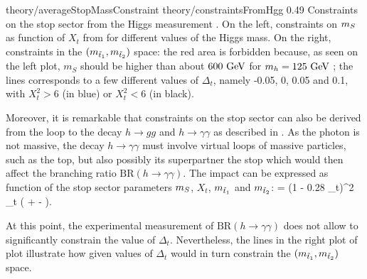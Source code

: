                      {theory/averageStopMassConstraint}
                     {theory/constraintsFromHgg}
                     {0.49}
                     {Constraints on the stop sector from the Higgs measurement \cite{TheLightStopWindow}.
                     On the left, constraints on $m_{S}$ as function of $X_t$ from
                     for different values of the Higgs mass. On the right, constraints
                     in the $(m_{\tilde{t}_1},m_{\tilde{t}_2})$ space: the
                     red area is forbidden because, as seen on the left plot, $m_S$
                     should be higher than about $600~\text{GeV}$ for $m_{h} = 125~\text{GeV}$ ;
                     the lines corresponds to a few different values of $\Delta_t$,
                     namely -0.05, 0, 0.05 and 0.1, with $X_t^2 > 6$ (in blue) or
                     $X_t^2 < 6$ (in black).
                     }

    Moreover, it is remarkable that constraints on the stop sector can also be derived
    from the loop to the decay $h \rightarrow gg$ and $h \rightarrow \gamma \gamma$
    as described in \cite{TheLightStopWindow}. As the photon is not massive,
    the decay $h \rightarrow \gamma \gamma$ must involve virtual loops of massive
    particles, such as the top, but also possibly its superpartner the stop which
    would then affect the branching ratio $\text{BR}(h \rightarrow \gamma\gamma)$.
    The impact can be expressed as function of the stop sector parameters $m_{S}$,
    $X_t$, $m_{\tilde{t}_1}$ and $m_{\tilde{t}_2}$:
    {
        =
        (1 - 0.28 \Delta_t)^2
        \hspace*{0.5cm}
        \hspace*{0.5cm}
        \Delta_t
        \approx
        \left(
            +
            -
        \right).
    }

    At this point, the experimental measurement of $\text{BR}(h\rightarrow\gamma\gamma)$
    does not allow to significantly constrain the value of $\Delta_t$. Nevertheless,
    the lines in the right plot of  plot illustrate
    how given values of $\Delta_t$ would in turn constrain the
    $(m_{\tilde{t}_1},m_{\tilde{t}_2})$ space.

